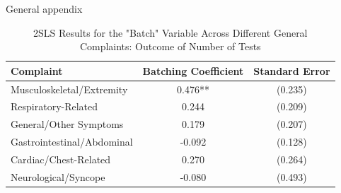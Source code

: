\documentclass[,,nonblindrev]{informs}
\begin{document}
\begin{APPENDIX}{General appendix}
\newpage

\begin{table}[ht]
\centering
\caption{2SLS Results for the "Batch" Variable Across Different General Complaints: Outcome of Number of Tests}
\begin{tabular}{lcc}
\hline
\textbf{Complaint} & \textbf{Batching Coefficient} & \textbf{Standard Error} \\
\hline
Musculoskeletal/Extremity & 0.476** & (0.235)  \\
Respiratory-Related & 0.244 & (0.209)   \\
General/Other Symptoms & 0.179 & (0.207)   \\
Gastrointestinal/Abdominal & -0.092 & (0.128)   \\
Cardiac/Chest-Related & 0.270 & (0.264)   \\
Neurological/Syncope & -0.080 & (0.493)   \\
\hline
\end{tabular}
\label{tab:batch_variable_outcome}
\end{table}

\end{APPENDIX}

%
%
%





\end{document}
